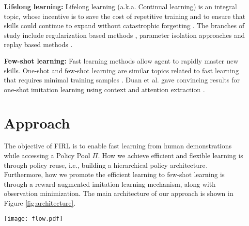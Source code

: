 \documentclass[conference]{IEEEtran}
\begin{document}
\textbf{Lifelong learning:} Lifelong learning (a.k.a. Continual learning) is an integral topic, whose incentive is to save the cost of repetitive training and to ensure that skills could continue to expand without catastrophic forgetting \cite{chen2018lifelong,li2019learn}. The branches of study include regularization based methods \cite{kirkpatrick2017overcoming,zenke2017continual}, parameter isolation approaches \cite{rusu2016progressive} and replay based methods \cite{lopez2017gradient,rebuffi2017icarl}.

\textbf{Few-shot learning:} Fast learning methods allow agent to rapidly master new skills. One-shot and few-shot learning are similar topics related
to fast learning that requires minimal training samples \cite{hakhamaneshi2021hierarchical}. Duan et al. gave convincing results for one-shot imitation learning
using context and attention extraction \cite{duan2017one}.

\section{Approach}
The objective of FIRL is to enable fast learning from human demonstrations while accessing a Policy Pool $\Pi$. How we achieve efficient and flexible learning is through policy reuse, i.e., building a hierarchical policy architecture. Furthermore, how we promote the efficient learning to few-shot learning is through a reward-augmented imitation learning mechanism, along with observation minimization. The main architecture of our approach is shown in Figure \ref{fig:architecture}.

\begin{figure*}[h]
    \centering
     \texttt{[image: flow.pdf]}
    \caption{Details of the FIRL architecture. A: During evaluation, the agent interacts with the environment and receives an observation. The vanilla observation will be fed to the sub-policies in the Policy Pool, while a reduce-dimension observation, i.e., $s^{m}_{t}$ is forwarded to the controller. The controller outputs a task predilection weights $w_t$ for choosing sub-skills. B: During training, the agent learns from demonstrations. At each time step, and actions from sub-policies $a^{p}_{t}$ are compared with action from demonstration $a^{d}_{t}$. The result along with the predilection vector, reward $r^{d}_{t}$ are used in computing the imitation loss. Lastly, the parameters of the controller is updated.}
    \label{fig:architecture}
\end{figure*}
\end{document}
